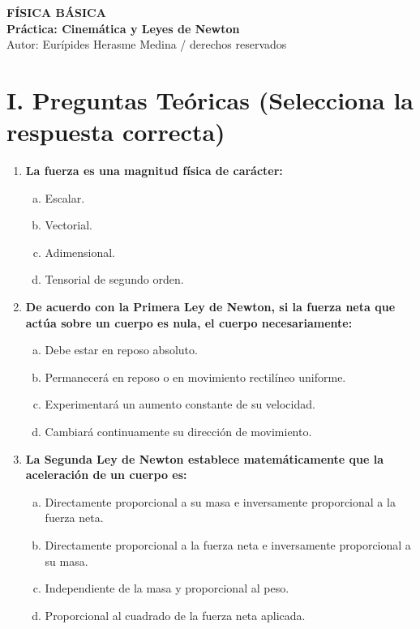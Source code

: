 \documentclass[11pt,a4paper]{article}
\begin{document}
\begin{center}
    \textbf{\Large FÍSICA BÁSICA} \\[0.2cm]
    \textbf{\large Práctica: Cinemática y Leyes de Newton} \\[0.1cm]
    \small Autor: Eurípides Herasme Medina / derechos reservados \\[0.4cm]
\end{center}

\hr
\section*{I. Preguntas Teóricas (Selecciona la respuesta correcta)}

\begin{enumerate}
    \item \textbf{La fuerza es una magnitud física de carácter:}
    \begin{enumerate}[a)]
        \item Escalar.
        \item Vectorial.
        \item Adimensional.
        \item Tensorial de segundo orden.
    \end{enumerate}

    \item \textbf{De acuerdo con la Primera Ley de Newton, si la fuerza neta que actúa sobre un cuerpo es nula, el cuerpo necesariamente:}
    \begin{enumerate}[a)]
        \item Debe estar en reposo absoluto.
        \item Permanecerá en reposo o en movimiento rectilíneo uniforme.
        \item Experimentará un aumento constante de su velocidad.
        \item Cambiará continuamente su dirección de movimiento.
    \end{enumerate}

    \item \textbf{La Segunda Ley de Newton establece matemáticamente que la aceleración de un cuerpo es:}
    \begin{enumerate}[a)]
        \item Directamente proporcional a su masa e inversamente proporcional a la fuerza neta.
        \item Directamente proporcional a la fuerza neta e inversamente proporcional a su masa.
        \item Independiente de la masa y proporcional al peso.
        \item Proporcional al cuadrado de la fuerza neta aplicada.
    \end{enumerate}


\end{enumerate}
\end{document}
